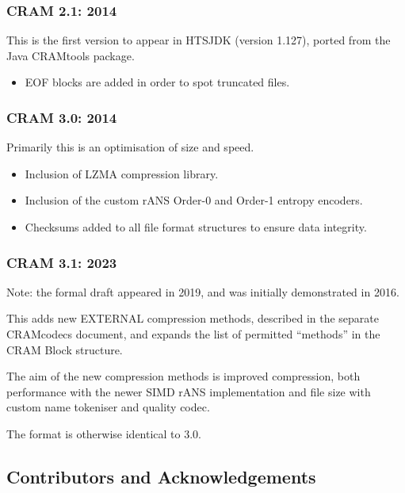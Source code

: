 \documentclass[a4paper]{article}
\begin{document}
\subsubsection*{CRAM 2.1: 2014}

This is the first version to appear in HTSJDK (version 1.127), ported
from the Java CRAMtools package.

\begin{itemize}
\item EOF blocks are added in order to spot truncated files.
\end{itemize}

\subsubsection*{CRAM 3.0: 2014}

Primarily this is an optimisation of size and speed.

\begin{itemize}
\item Inclusion of LZMA compression library.
\item Inclusion of the custom rANS Order-0 and Order-1 entropy encoders.
\item Checksums added to all file format structures to ensure data integrity.
\end{itemize}

\subsubsection*{CRAM 3.1: 2023}

Note: the formal draft appeared in 2019, and was initially
demonstrated in 2016.

This adds new EXTERNAL compression methods, described in the separate
CRAMcodecs document, and expands the list of permitted ``methods'' in
the CRAM Block structure.

The aim of the new compression methods is improved compression, both
performance with the newer SIMD rANS implementation and file size with
custom name tokeniser and quality codec.

The format is otherwise identical to 3.0.

\newpage

\subsection{\textbf{Contributors and Acknowledgements}}
\end{document}
